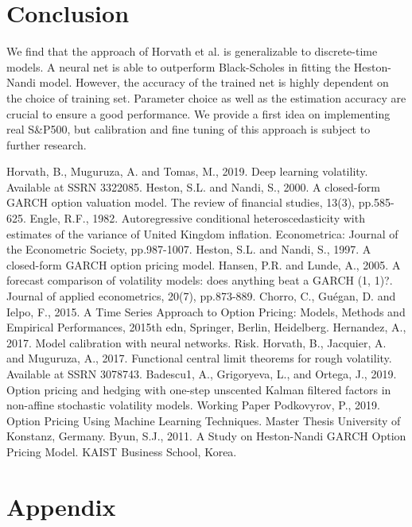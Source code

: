 \documentclass{article}
\begin{document}
\section{Conclusion}
We find that the approach of Horvath et al. \cite{Blanka} is generalizable to discrete-time models. A neural net is able to outperform Black-Scholes in fitting the Heston-Nandi model. However, the accuracy of the trained net is highly dependent on the choice of training set. Parameter choice as well as the estimation accuracy are crucial to ensure a good performance. We provide a first idea on implementing real S\&P500, but calibration and fine tuning of this approach is subject to further research. 
\begin{thebibliography}{9}
Horvath, B., Muguruza, A. and Tomas, M., 2019. Deep learning volatility. Available at SSRN 3322085.
Heston, S.L. and Nandi, S., 2000. A closed-form GARCH option valuation model. The review of financial studies, 13(3), pp.585-625.
Engle, R.F., 1982. Autoregressive conditional heteroscedasticity with estimates of the variance of United Kingdom inflation. Econometrica: Journal of the Econometric Society, pp.987-1007.
 Heston, S.L. and Nandi, S., 1997. A closed-form GARCH option pricing model.
Hansen, P.R. and Lunde, A., 2005. A forecast comparison of volatility models: does anything beat a GARCH (1, 1)?. Journal of applied econometrics, 20(7), pp.873-889.
Chorro, C., Guégan, D. and Ielpo, F., 2015. A Time Series Approach to Option Pricing: Models, Methods and Empirical Performances, 2015th edn, Springer, Berlin, Heidelberg.
Hernandez, A., 2017. Model calibration with neural networks. Risk.
Horvath, B., Jacquier, A. and Muguruza, A., 2017. Functional central limit theorems for rough volatility. Available at SSRN 3078743.
Badescu1, A., Grigoryeva, L., and Ortega, J., 2019. Option pricing and hedging with one-step unscented Kalman filtered factors in non-affine stochastic volatility models. Working Paper
 Podkovyrov, P., 2019. Option Pricing Using Machine Learning Techniques. Master Thesis University of Konstanz, Germany.
 Byun, S.J., 2011. A Study on Heston-Nandi GARCH Option Pricing Model. KAIST Business
School, Korea.
\end{thebibliography}\newpage
\section*{Appendix}
\appendix
\end{document}
